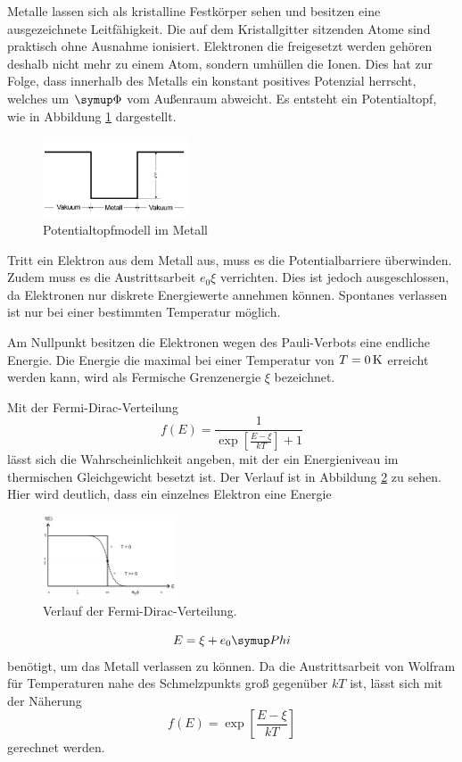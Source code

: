 Metalle lassen sich als kristalline Festkörper sehen und besitzen eine ausgezeichnete
Leitfähigkeit. Die auf dem Kristallgitter sitzenden Atome sind praktisch
ohne Ausnahme ionisiert. Elektronen die freigesetzt werden gehören deshalb nicht
mehr zu einem Atom, sondern umhüllen die Ionen. Dies hat zur Folge, dass innerhalb
des Metalls ein konstant positives Potenzial herrscht, welches um $\su{\Phi}$
vom Außenraum abweicht. Es entsteht ein Potentialtopf, wie in Abbildung \ref{topf}
dargestellt.
\begin{figure}
  \includegraphics[width=4.3cm]{bilder/topf.jpg}
  \caption{Potentialtopfmodell im Metall \cite{504}}
  \label{topf}
\end{figure}
Tritt ein Elektron aus dem Metall aus, muss es die Potentialbarriere überwinden.
Zudem muss es die Austrittsarbeit $e_0\xi$ verrichten. Dies ist jedoch ausgeschlossen,
da Elektronen nur diskrete Energiewerte annehmen können. Spontanes verlassen ist
nur bei einer bestimmten Temperatur möglich.

Am Nullpunkt besitzen die Elektronen wegen des Pauli-Verbots eine endliche
Energie. Die Energie die maximal bei einer Temperatur von $T=0\,\si{\kelvin}$ erreicht
werden kann, wird als Fermische Grenzenergie $\xi$ bezeichnet.

Mit der Fermi-Dirac-Verteilung
\begin{equation}
  f(E) = \frac{1}{\exp\left[\frac{E-\xi}{kT}\right]+1}
  \label{eqn:fermi}
\end{equation}
lässt sich die Wahrscheinlichkeit angeben, mit der ein Energieniveau im thermischen
Gleichgewicht besetzt ist. Der Verlauf ist in Abbildung \ref{dirac} zu sehen.
Hier wird deutlich, dass ein einzelnes Elektron eine Energie
\begin{figure}
  \includegraphics[width = 4cm]{bilder/dirac.jpg}
  \caption{Verlauf der Fermi-Dirac-Verteilung.\cite{504}}
  \label{dirac}
\end{figure}
\begin{equation*}
  E = \xi + e_0\su{Phi}
\end{equation*}
benötigt, um das Metall verlassen zu können. Da die Austrittsarbeit von Wolfram
für Temperaturen nahe des Schmelzpunkts groß gegenüber $kT$ ist, lässt sich mit
der Näherung
\begin{equation}
  f(E) = \exp\left[\frac{E-\xi}{kT}\right]
  \label{eqn:fermi2}
\end{equation}
gerechnet werden.

